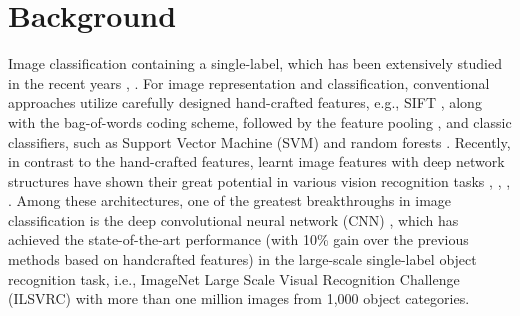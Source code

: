 \section{Background}
Image classification containing a single-label, which
has been extensively studied in the recent
years \cite{1}, \cite{2}. For image representation and
classification, conventional approaches utilize carefully designed hand-crafted features, e.g., SIFT \cite{3},
along with the bag-of-words coding scheme, followed
by the feature pooling \cite{4}, \cite{5} and classic
classifiers, such as Support Vector Machine (SVM) \cite{6}
and random forests \cite{7}. Recently, in contrast to the
hand-crafted features, learnt image features with deep
network structures  have shown their great potential
in various vision recognition tasks \cite{8}, \cite{9}, \cite{10},
\cite{11}. Among these architectures, one of the greatest breakthroughs in image classification is the deep
convolutional neural network (CNN) \cite{10}, which has
achieved the state-of-the-art performance (with 10\%
gain over the previous methods based on handcrafted features) in the large-scale single-label object
recognition task, i.e., ImageNet Large Scale Visual
Recognition Challenge (ILSVRC) \cite{2} with more than
one million images from 1,000 object categories.\hfill \break

